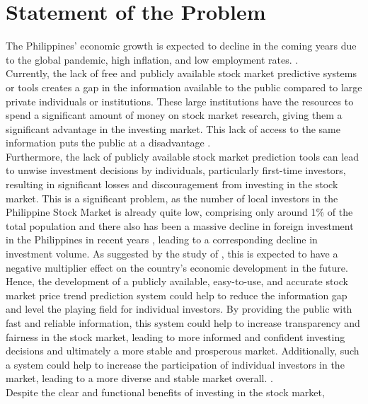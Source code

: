 \section{Statement of the Problem}
\label{sec:problem}
The Philippines' economic growth is expected to decline in the coming 
years due to the global pandemic, high inflation, and low employment rates. 
\cite{Alegado2022,Canto2022,Reuters2022}.
\\Currently, the lack of free and publicly available stock market predictive systems or
 tools creates a gap in the information available to the public compared to large private 
 individuals or institutions. These large institutions have the resources to spend a significant 
 amount of money on stock market research, giving them a significant advantage in the investing 
 market. This lack of access to the same information puts the public at a disadvantage
 \cite{Kim2022}. 
\\ Furthermore, the lack of publicly available stock market prediction tools can 
lead to unwise investment decisions by individuals, particularly first-time investors, 
resulting in significant losses and discouragement from investing in the stock market. 
This is a significant problem, as the number of local investors in the Philippine Stock Market 
is already quite low, comprising only around 1\% of 
the total population and there also has been a massive decline in foreign investment
 in the Philippines in recent years 
 \cite{BusinessWorld2022}, 
 leading to a corresponding decline in investment volume. 
 As suggested by the study of , 
 this is expected to have a negative multiplier effect on the country's 
 economic development in the future. 
\\ Hence, the development of a publicly available, easy-to-use, and
 accurate stock market price trend prediction system could help to 
 reduce the information gap and level the playing field for individual investors. 
 By providing the public with fast and reliable information, this system could help to
  increase transparency and fairness in the stock market, leading to more informed 
  and confident investing decisions and ultimately a more stable and prosperous market.
   Additionally, such a system could help to increase the participation of individual 
   investors in the market, leading to a more diverse and stable market overall.
\cite{Statista2022,POPCOMM2021}.
\\Despite the clear and functional benefits of investing in the stock market, 
